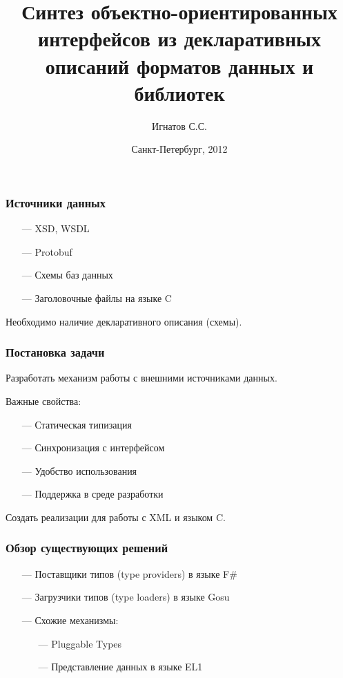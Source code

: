 \documentclass[14pt]{beamer}
\begin{document}
\title{Синтез объектно-ориентированных интерфейсов из декларативных описаний форматов данных и библиотек}
\author{Игнатов С.С.}
\date{Санкт-Петербург, 2012}

\frame{\titlepage}


\begin{frame}\frametitle{Источники данных}
    \begin{itemize}
        \item[---] XSD, WSDL
        \item[---] Protobuf
        \item[---] Схемы баз данных
        \item[---] Заголовочные файлы на языке C
    \end{itemize}
    \small{Необходимо наличие декларативного описания (схемы).}
\end{frame}

\begin{frame}\frametitle{Постановка задачи}
    Разработать механизм работы с внешними источниками данных.

    Важные свойства:
    \begin{itemize}
        \item[---] Статическая типизация
        \item[---] Синхронизация с интерфейсом
        \item[---] Удобство использования
        \item[---] Поддержка в среде разработки
    \end{itemize}
    Создать реализации для работы с XML и языком C.

\end{frame}

\begin{frame}\frametitle{Обзор существующих решений} %
    \begin{itemize}
        \item[---] Поставщики типов (type providers) в языке F\#
        \item[---] Загрузчики типов (type loaders) в языке Gosu
        \item[---] Схожие механизмы:
            \begin{itemize}
                \item[---] Pluggable Types
                \item[---] Представление данных в языке EL1
            \end{itemize}
    \end{itemize}
\end{frame}
\end{document}
